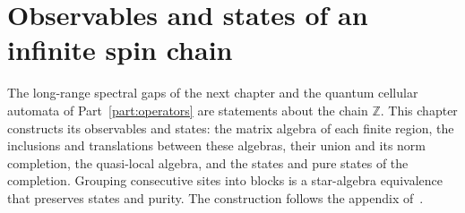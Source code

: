 \chapter{Observables and states of an infinite spin chain}
\label{ch:spin_chain_observables}

The long-range spectral gaps of the next chapter and the quantum cellular
automata of Part~\ref{part:operators} are statements about the chain
$\mathbb Z$. This chapter constructs its observables and states: the matrix
algebra of each finite region, the inclusions and translations between these
algebras, their union and its norm completion, the quasi-local algebra, and the
states and pure states of the completion. Grouping consecutive sites into blocks
is a star-algebra equivalence that preserves states and purity. The
construction follows the appendix of~\cite{Cirac2017MPU}.


